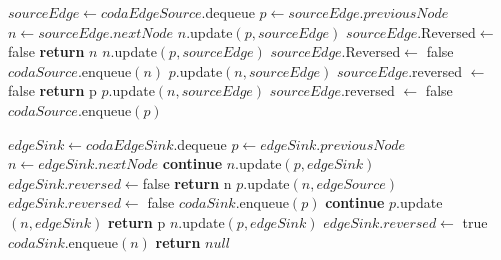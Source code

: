 \documentclass{article}
\begin{document}
\newpage
\begin{algorithm}
    \begin{algorithmic}
        \STATE $sourceEdge \leftarrow codaEdgeSource.$dequeue
        \STATE $p \leftarrow sourceEdge.previousNode$
        \STATE $n \leftarrow sourceEdge.nextNode$
        \STATE $n.$update$(p,sourceEdge)$
        \STATE $sourceEdge$.Reversed$\leftarrow$ false
        \STATE\textbf{return} $n$
        \ENDIF
        \ELSE
        \STATE $n.$update$(p,sourceEdge)$
        \STATE $sourceEdge$.Reversed$\leftarrow$ false
        \STATE $codaSource.$enqueue$(n)$
        \ENDIF
        \STATE $p.$update$(n,sourceEdge)$
        \STATE $sourceEdge.$reversed $\leftarrow$ false
        \STATE \textbf{return} p
        \ENDIF
        \ELSE
        \STATE $p.$update$(n,sourceEdge)$
        \STATE $sourceEdge.$reversed $\leftarrow$ false
        \STATE$codaSource.$enqueue$(p)$
        \ENDIF
        \ENDIF
        \ENDIF
    \end{algorithmic}
\end{algorithm}
\newpage
\begin{algorithm}
    \begin{algorithmic}
        \STATE $edgeSink \leftarrow codaEdgeSink.$dequeue
        \STATE $p \leftarrow edgeSink.previousNode$
        \STATE $n \leftarrow edgeSink.nextNode$
        \STATE \textbf{continue}
        \ELSE
        \STATE $n.$update$(p,edgeSink)$
        \STATE $edgeSink.reversed \leftarrow $false
        \STATE \textbf{return} n
        \ENDIF
        \ENDIF
        \STATE $p.$update$(n,edgeSource)$
        \STATE$edgeSink.reversed \leftarrow$ false
        \STATE $codaSink.$enqueue$(p)$
        \STATE \textbf{continue}
        \ELSE
        \STATE $p.$update$(n,edgeSink)$
        \STATE \textbf{return} p
        \ENDIF
        \ENDIF
        \STATE $n.$update$(p,edgeSink)$
        \STATE $edgeSink.reversed \leftarrow$ true
        \STATE $codaSink.$enqueue$(n)$
        \ENDIF
        \ENDIF
        \ENDWHILE
        \ENDWHILE
        \STATE \textbf{return} $null$
    \end{algorithmic}
\end{algorithm}
\end{document}

